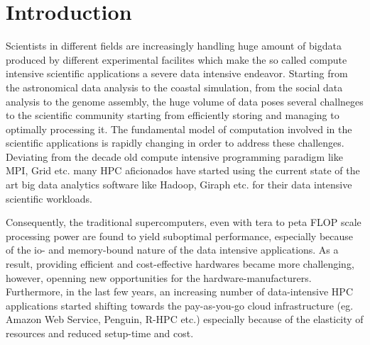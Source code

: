 \documentclass[conference]{IEEEtran}
\begin{document}


%
\IEEEpeerreviewmaketitle



\section {Introduction}
Scientists in different fields are increasingly handling huge amount of bigdata produced by different experimental facilites which make the so called compute intensive scientific applications a severe data intensive endeavor. 
Starting from the astronomical data analysis to the coastal simulation, from the social data analysis to the genome assembly, the huge volume of data poses several challneges to the scientific community starting from efficiently storing and managing to optimally processing it.
The fundamental model of computation involved in the scientific applications is rapidly changing in order to address these challenges.
Deviating from the decade old compute intensive programming paradigm like MPI, Grid etc. many HPC aficionados have started using the current state of the art big data analytics software like Hadoop, Giraph etc. for their data intensive scientific workloads.

Consequently, the traditional supercomputers, even with tera to peta FLOP scale processing power are found to yield suboptimal performance, especially because of the io- and memory-bound nature of the data intensive applications.
As a result, providing efficient and cost-effective hardwares became more challenging, however, openning new opportunities for the hardware-manufacturers.
Furthermore, in the last few years, an increasing number of data-intensive HPC applications started shifting towards the pay-as-you-go cloud infrastructure (eg. Amazon Web Service, Penguin, R-HPC etc.) especially because of the elasticity of resources and reduced setup-time and cost.
\end{document}
